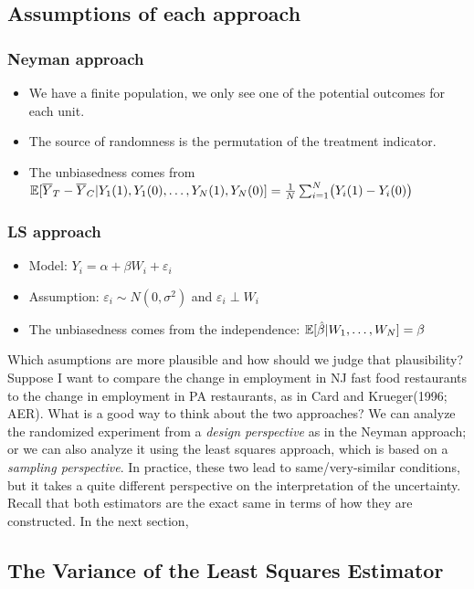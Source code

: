 \subsection{Assumptions of each approach}

\subsubsection{Neyman approach}
\begin{itemize}
    \item We have a finite population, we only see one of the potential outcomes for each unit.
    \item The source of randomness is the permutation of the treatment indicator.
    \item The unbiasedness comes from ${\mathbb{E}}[\overline{Y}_T - \overline{Y}_C|Y_1(1), Y_1(0), \dots, Y_N(1), Y_N(0)] = \frac{1}{N}\sum_{i=1}^N \bigl(Y_i(1) - Y_i(0)\bigr)$
\end{itemize}

\subsubsection{LS approach}
\begin{itemize}
    \item Model: $Y_i = \alpha + \beta W_i + \varepsilon_i$
    \item Assumption: $\varepsilon_i \sim N(0, \sigma^2)$ and $\varepsilon_i \perp W_i$
    \item The unbiasedness comes from the independence: ${\mathbb{E}}[\hat\beta|W_1, \dots, W_N] = \beta$
\end{itemize}

Which asumptions are more plausible and how should we judge that plausibility?
Suppose I want to compare the change in employment in NJ fast food
restaurants to the change in employment in PA restaurants, as in
Card and Krueger(1996; AER). What is a good way to think about the two approaches?
We can analyze the randomized experiment from a \textit{design perspective} as in the Neyman approach;
or we can also analyze it using the least squares approach, which is based on a \textit{sampling perspective}.
In practice, these two lead to same/very-similar conditions, but it takes a quite different perspective on the interpretation of the uncertainty.
Recall that both estimators are the exact same in terms of how they are constructed.
In the next section, 


\subsection{The Variance of the Least Squares Estimator}

